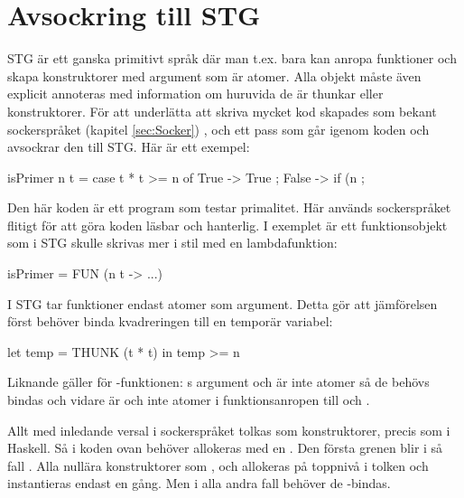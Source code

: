 \documentclass[../Core]{subfiles}
\begin{document}
\section{Avsockring till STG}
\label{sec:Diabetes}

STG är ett ganska primitivt språk där man t.ex. bara kan anropa funktioner
och skapa konstruktorer med argument som är atomer. Alla objekt måste även
explicit annoteras med information om huruvida de är thunkar eller konstruktorer. För att underlätta
att skriva mycket kod skapades som bekant sockerspråket (kapitel \ref{sec:Socker})
, och ett
pass som går igenom koden och avsockrar den till STG. Här är ett exempel:

\begin{codeEx}
isPrimer n t = case t * t >= n of
    { True -> True
    ; False -> if (n %
    };
\end{codeEx}

Den här koden är ett program som testar
primalitet. Här används sockerspråket flitigt för att göra koden läsbar
och hanterlig. I exemplet är  ett funktionsobjekt som i 
STG skulle skrivas mer i stil med en lambdafunktion:

\begin{codeEx}          
isPrimer = FUN (n t -> ...)
\end{codeEx}


I STG tar funktioner endast atomer som argument. Detta gör att 
jämförelsen  först behöver binda kvadreringen
till en temporär variabel:

\begin{codeEx}
let temp = THUNK (t * t)
in  temp >= n
\end{codeEx}

Liknande gäller för -funktionen: s argument  och 
 är inte atomer så de behövs bindas och vidare
är  och  inte atomer i  
funktionsanropen till \miniCode{==} och .


Allt med inledande versal i sockerspråket tolkas som konstruktorer,
precis som i Haskell. Så  i koden ovan behöver allokeras med
en . Den första grenen blir i så fall
  .
Alla nullära konstruktorer som ,  och  
allokeras på toppnivå i tolken och instantieras endast en gång. 
Men i alla andra fall behöver de -bindas.
\end{document}
